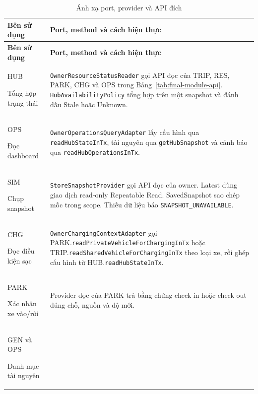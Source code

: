 \begin{longtable}{|L{31mm}|L{114mm}|}
\caption{Ánh xạ port, provider và API đích}\label{tab:final-module-ports}\\\hline
\textbf{Bên sử dụng} & \textbf{Port, method và cách hiện thực}\\\hline
\endfirsthead
\hline\textbf{Bên sử dụng} & \textbf{Port, method và cách hiện thực}\\\hline
\endhead
HUB \par Tổng hợp trạng thái &
\texttt{OwnerResourceStatusReader} gọi API đọc của TRIP, RES, PARK, CHG và OPS trong Bảng~\ref{tab:final-module-api}. \texttt{HubAvailabilityPolicy} tổng hợp trên một snapshot và đánh dấu Stale hoặc Unknown.\\\hline
OPS \par Đọc dashboard &
\texttt{OwnerOperationsQueryAdapter} lấy cấu hình qua \texttt{readHubStateInTx}, tài nguyên qua \texttt{getHubSnapshot} và cảnh báo qua \texttt{readHubOperationsInTx}.\\\hline
SIM \par Chụp snapshot &
\texttt{StoreSnapshotProvider} gọi API đọc của owner. Latest dùng giao dịch read-only Repeatable Read. SavedSnapshot sao chép mốc trong scope. Thiếu dữ liệu báo \texttt{SNAPSHOT\_UNAVAILABLE}.\\\hline
CHG \par Đọc điều kiện sạc &
\texttt{OwnerChargingContextAdapter} gọi PARK.\allowbreak\texttt{readPrivateVehicleForChargingInTx} hoặc TRIP.\allowbreak\texttt{readSharedVehicleForChargingInTx} theo loại xe, rồi ghép cấu hình từ HUB.\allowbreak\texttt{readHubStateInTx}.\\\hline
PARK \par Xác nhận xe vào/rời &
Provider đọc của PARK trả bằng chứng check-in hoặc check-out đúng chỗ, nguồn và độ mới.\\\hline
GEN và OPS \par Danh mục tài nguyên &

\end{longtable}
